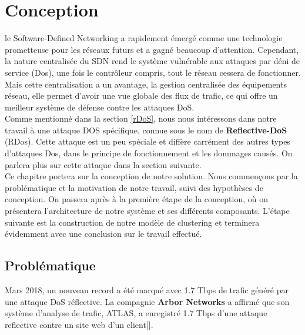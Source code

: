 \chapter{Conception}

\label{Chapter4} 
le Software-Defined Networking a rapidement émergé comme une technologie prometteuse pour les réseaux futurs et a gagné beaucoup d'attention. Cependant, la nature centralisée du SDN rend le système vulnérable aux attaques par déni de service (Dos), une fois le contrôleur compris, tout le réseau cessera de fonctionner. Mais cette centralisation a un avantage, la gestion centralisée des équipements réseau, elle permet d'avoir une vue globale des flux de trafic, ce qui offre un meilleur système de défense contre les attaques DoS.\\

Comme mentionné dans la section \ref{rDoS}, nous nous intéressons dans notre travail à une attaque DOS spécifique, connue sous le nom de \textbf{Reflective-DoS} (RDos). Cette attaque est un peu spéciale et diffère carrément des autres types d'attaques Dos, dans le principe de fonctionnement et les dommages causés. On parlera plus sur cette attaque dans la section suivante. \\

Ce chapitre portera sur la conception de notre solution. Nous commençons par la problématique et la motivation de notre travail, suivi des hypothèses de conception. On passera après à la première étape de la conception, où on présentera l'architecture de notre système et ses différents composants. L'étape suivante est la construction de notre modèle de clustering  et terminera évidemment avec une conclusion sur le travail effectué.

\section{Problématique}
Mars 2018, un nouveau record a été marqué avec 1.7 Tbps de trafic généré par une attaque DoS réflective. La compagnie \textbf{Arbor Networks} a affirmé que son système d'analyse de trafic, ATLAS, a enregistré 1.7 Tbps d'une attaque reflective contre un site web d'un client[\cite{19}].\\

